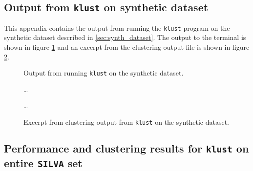 \subsection{Output from \texttt{klust} on synthetic dataset}
\label{app:synth_dataset}

This appendix contains the output from running the \texttt{klust} program on
the synthetic dataset described in \ref{sec:synth_dataset}. The output to the
terminal is shown in figure \ref{fig:synth_silva_output} and an excerpt from
the clustering output file is shown in figure \ref{fig:synth_silva_clustering}.

\begin{figure}[H]
  \centering
  
  \caption{Output from running \texttt{klust} on the synthetic dataset.}
  \label{fig:synth_silva_output}
\end{figure}

\begin{figure}[H]
  \centering
  
  \dots
  
  \dots
  
  \caption{Excerpt from clustering output from \texttt{klust} on the
    synthetic dataset.}
  \label{fig:synth_silva_clustering}
\end{figure}


\subsection{Performance and clustering results for \texttt{klust} on entire \texttt{SILVA} set}
\label{app:performance_results_full_SILVA}

